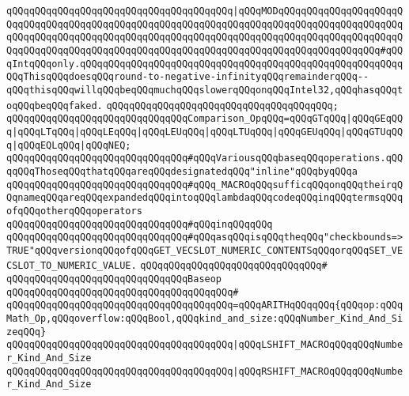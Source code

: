 \verb|qQQqqQQqqQQqqQQqqQQqqQQqqQQqqQQqqQQqqQQq|\verb#|qQQqMODqQQqqQQqqQQqqQQqqQQqqQQqqQQqqQQqqQQqqQQqqQQqqQQqqQQqqQQqqQQqqQQqqQQqqQQqqQQqqQQqqQQqqQQqqQQqqQQqqQQqqQQqqQQqqQQqqQQqqQQqqQQqqQQqqQQqqQQqqQQqqQQqqQQqqQQqqQQqqQQqqQQqqQQqqQQqqQQqqQQqqQQqqQQqqQQqqQQqqQQqqQQqqQQqqQQqqQQqqQQqqQQqqQQq#\verb|#qQQqIntqQQqonly.qQQqqQQqqQQqqQQqqQQqqQQqqQQqqQQqqQQqqQQqqQQqqQQqqQQqqQQqqQQqThisqQQqdoesqQQqround-to-negative-infinityqQQqremainderqQQq--qQQqthisqQQqwillqQQqbeqQQqmuchqQQqslowerqQQqonqQQqIntel32,qQQqhasqQQqtoqQQqbeqQQqfaked.|\newline
\verb|qQQqqQQqqQQqqQQqqQQqqQQqqQQqqQQqqQQqqQQq;|\newline
\newline
\verb|qQQqqQQqqQQqqQQqqQQqqQQqqQQqqQQqComparison_OpqQQq=qQQqGTqQQq|\verb#|qQQqGEqQQq|qQQqLTqQQq|qQQqLEqQQq|qQQqLEUqQQq|qQQqLTUqQQq|qQQqGEUqQQq|qQQqGTUqQQq|qQQqEQLqQQq|qQQqNEQ;#\newline
\newline
\newline
\verb|qQQqqQQqqQQqqQQqqQQqqQQqqQQqqQQq#qQQqVariousqQQqbaseqQQqoperations.qQQqqQQqThoseqQQqthatqQQqareqQQqdesignatedqQQq"inline"qQQqbyqQQqa|\newline
\verb|qQQqqQQqqQQqqQQqqQQqqQQqqQQqqQQq#qQQq_MACROqQQqsufficqQQqonqQQqtheirqQQqnameqQQqareqQQqexpandedqQQqintoqQQqlambdaqQQqcodeqQQqinqQQqtermsqQQqofqQQqotherqQQqoperators|\newline
\verb|qQQqqQQqqQQqqQQqqQQqqQQqqQQqqQQq#qQQqinqQQqqQQq|\newline
\verb|qQQqqQQqqQQqqQQqqQQqqQQqqQQqqQQq#qQQqasqQQqisqQQqtheqQQq"checkbounds=>TRUE"qQQqversionqQQqofqQQqGET_VECSLOT_NUMERIC_CONTENTSqQQqorqQQqSET_VECSLOT_TO_NUMERIC_VALUE.|\newline
\verb|qQQqqQQqqQQqqQQqqQQqqQQqqQQqqQQq#|\newline
\verb|qQQqqQQqqQQqqQQqqQQqqQQqqQQqqQQqBaseop|\newline
\verb|qQQqqQQqqQQqqQQqqQQqqQQqqQQqqQQqqQQqqQQq#|\newline
\verb|qQQqqQQqqQQqqQQqqQQqqQQqqQQqqQQqqQQqqQQq=qQQqARITHqQQqqQQq{qQQqop:qQQqMath_Op,qQQqoverflow:qQQqBool,qQQqkind_and_size:qQQqNumber_Kind_And_SizeqQQq}|\newline
\verb|qQQqqQQqqQQqqQQqqQQqqQQqqQQqqQQqqQQqqQQq|\verb#|qQQqLSHIFT_MACROqQQqqQQqNumber_Kind_And_Size#\newline
\verb|qQQqqQQqqQQqqQQqqQQqqQQqqQQqqQQqqQQqqQQq|\verb#|qQQqRSHIFT_MACROqQQqqQQqNumber_Kind_And_Size#\newline
